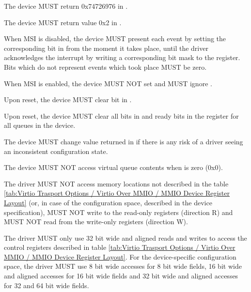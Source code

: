 
The device MUST return 0x74726976 in .

The device MUST return value 0x2 in .

When MSI is disabled, the device MUST present each event by setting the
corresponding bit in  from the
moment it takes place, until the driver acknowledges the interrupt
by writing a corresponding bit mask to the  register.
Bits which do not represent events which took place MUST be zero.

When MSI is enabled, the device MUST NOT set  and MUST
ignore .

Upon reset, the device MUST clear  bit in .

Upon reset, the device MUST clear all bits in  and ready bits in the
 register for all queues in the device.

The device MUST change value returned in  if there is any risk of a
driver seeing an inconsistent configuration state.

The device MUST NOT access virtual queue contents when  is zero (0x0).

The driver MUST NOT access memory locations not described in the
table \ref{tab:Virtio Trasport Options / Virtio Over MMIO / MMIO Device Register Layout}
(or, in case of the configuration space, described in the device specification),
MUST NOT write to the read-only registers (direction R) and
MUST NOT read from the write-only registers (direction W).

The driver MUST only use 32 bit wide and aligned reads and writes to access the control registers
described in table \ref{tab:Virtio Trasport Options / Virtio Over MMIO / MMIO Device Register Layout}.
For the device-specific configuration space, the driver MUST use 8 bit wide accesses for
8 bit wide fields, 16 bit wide and aligned accesses for 16 bit wide fields and 32 bit wide and
aligned accesses for 32 and 64 bit wide fields.

